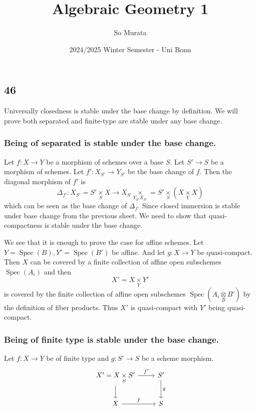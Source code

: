 \documentclass{article}
\title{Algebraic Geometry 1}
\author{So Murata}
\date{2024/2025 Winter Semester - Uni Bonn}
\numberwithin{equation}{section}
\DeclareMathOperator{\Spec}{Spec}
\newcommand{\fib}[1]{%
  \mathbin{\mathop{\times}\limits_{#1}}%
}
\newcommand{\tens}[1]{%
  \mathbin{\mathop{\otimes}\limits_{#1}}%
}
\begin{document}
\maketitle
\subsection*{46}

Universally closedness is stable under the base change by definition. We will prove both separated and finite-type are stable under any base change.

\subsubsection*{Being of separated is stable under the base change.}

Let $f:X\to Y$ be a morphism of schemes over a base $S$. Let $S'\to S$ be a morphism of schemes. Let $f':X_{S'}\to Y_{S'}$ be the base change of $f$. Then the diagonal morphism of $f'$ is 
\begin{equation*}
\Delta_{f'}:X_{S'} = S'\fib{S}X\to X_{S'}\fib{Y_{S'}X_{S'}} = S'\fib{S}(X\fib{Y}X)
\end{equation*}
which can be seen as the base change of $\Delta_f$. Since closed immersion is stable under base change from the previous sheet. We need to show that quasi-compactness is stable under the base change.\\
\par We see that it is enough to prove the case for affine schemes. Let $Y=\Spec(B),Y'=\Spec(B')$ be affine. And let $g:X\to Y$ be quasi-compact. Then $X$ can be covered by a finite collection of affine open subschemes $\Spec(A_i)$ and then
\begin{equation*}
X'=X\fib{Y}Y'
\end{equation*}
is covered by the finite collection of affine open subschemes $\Spec(A_i\tens{B}B')$ by the definition of fiber products. Thus $X'$ is quasi-compact with $Y'$ being quasi-compact.

\subsubsection*{Being of finite type is stable under the base change.}

Let $f:X\to Y$ be of finite type and $g:S'\to S$ be a scheme morphism. 
\[
\begin{tikzcd}
X'=X\fib{S}S'\arrow[r,"f'"]\arrow[d]&S'\arrow[d,"g"]\\
X\arrow[r,"f"]&S
\end{tikzcd}
\]
\end{document}
